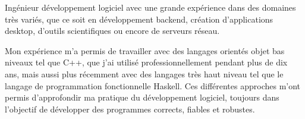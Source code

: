 
\begin{cvparagraph}

    Ingénieur développement logiciel avec une grande expérience dans des
    domaines très variés, que ce soit en développement backend, création
    d'applications desktop, d'outils scientifiques ou encore de serveurs
    réseau.

    Mon expérience m'a permis de travailler avec des langages orientés objet
    bas niveaux tel que C++, que j'ai utilisé professionnellement pendant plus
    de dix ans, mais aussi plus récemment avec des langages très haut niveau
    tel que le langage de programmation fonctionnelle Haskell. Ces différentes
    approches m'ont permis d'approfondir ma pratique du développement logiciel,
    toujours dans l'objectif de développer des programmes corrects, fiables et
    robustes.

\end{cvparagraph}

